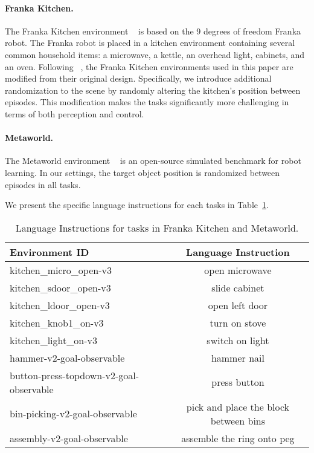 \paragraph{Franka Kitchen.} The Franka Kitchen environment ~\cite{corl19-franka,corr20-franka} is based on the 9 degrees of freedom Franka robot. The Franka robot is placed in a kitchen environment containing several common household items: a microwave, a kettle, an overhead light, cabinets, and an oven. Following ~\cite{corl22-r3m}, the Franka Kitchen environments used in this paper are modified from their original design. Specifically, we introduce additional randomization to the scene by randomly altering the kitchen's position between episodes. This modification makes the tasks significantly more challenging in terms of both perception and control.
\paragraph{Metaworld.} The Metaworld environment ~\cite{corl19-metaworld} is an open-source simulated benchmark for robot learning. In our settings, the target object position is randomized between episodes in all tasks. 

We present the specific language instructions for each tasks in Table~\ref{tab:environment_language}.  


\begin{table}[h]
    \centering
    \caption{Language Instructions for tasks in Franka Kitchen and Metaworld.}
    \label{tab:environment_language}
    \begin{tabular}{lc}
        \toprule
        Environment ID & Language Instruction     \\ \hline
        kitchen\_micro\_open-v3  & open microwave         \\ 
        kitchen\_sdoor\_open-v3  & slide cabinet    \\ 
        kitchen\_ldoor\_open-v3  & open left door         \\
        kitchen\_knob1\_on-v3    & turn on stove          \\ 
        kitchen\_light\_on-v3    & switch on light        \\ 
        \midrule
        hammer-v2-goal-observable & hammer nail \\
        button-press-topdown-v2-goal-observable & press button \\
        bin-picking-v2-goal-observable & pick and place the block between bins \\
        assembly-v2-goal-observable & assemble the ring onto peg \\
        \bottomrule
    \end{tabular}
    
\end{table}



